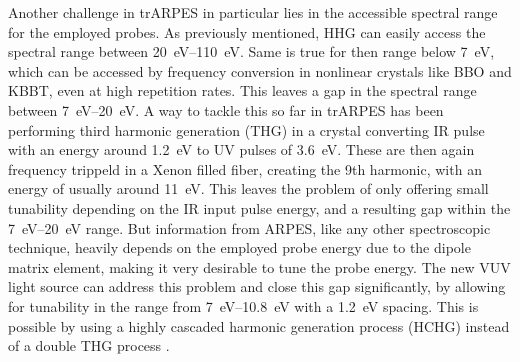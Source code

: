 Another challenge in trARPES in particular lies in the accessible spectral range for the employed probes.
As previously mentioned, HHG can easily access the spectral range between \qtyrange{20}{110}{\electronvolt}.
Same is true for then range below \qty{7}{\electronvolt}, which can be accessed by frequency conversion in nonlinear crystals like BBO and KBBT, even at high repetition rates.
This leaves a gap in the spectral range between \qtyrange{7}{20}{\electronvolt}.
A way to tackle this so far in trARPES has been performing third harmonic generation (THG) in a crystal converting IR pulse with an energy around \qty{1.2}{\electronvolt} to UV pulses of \qty{3.6}{\electronvolt}.
These are then again frequency trippeld in a Xenon filled fiber, creating the 9th harmonic, with an energy of usually around \qty{11}{\electronvolt}.
This leaves the problem of only offering small tunability depending on the IR input pulse energy, and a resulting gap within the \qtyrange{7}{20}{\electronvolt} range.
But information from ARPES, like any other spectroscopic technique, heavily depends on the employed probe energy due to the dipole matrix element, making it very desirable to tune the probe energy.
The new VUV light source can address this problem and close this gap significantly, by allowing for tunability in the range from \qtyrange{7}{10.8}{\electronvolt} with a \qty{1.2}{\electronvolt} spacing.
This is possible by using a highly cascaded harmonic generation process (HCHG) instead of a double THG process \cite{couch_ultrafast_2020}.


